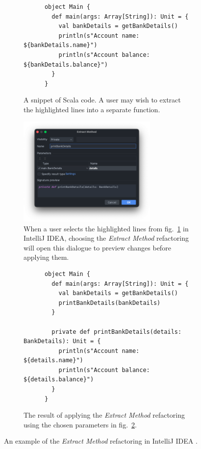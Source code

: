 \begin{figure}[htbp]
  \centering
  \begin{subfigure}{\textwidth}
    \centering
    \begin{verbatim}
      object Main {
        def main(args: Array[String]): Unit = {
          val bankDetails = getBankDetails()
          println(s"Account name: ${bankDetails.name}")
          println(s"Account balance: ${bankDetails.balance}")
        }
      }
    \end{verbatim}
    \caption{A snippet of Scala code. A user may wish to extract the highlighted lines into a separate function.}
    \label{fig:extract-function-intellij-before}
  \end{subfigure}
  \begin{subfigure}{\textwidth}
    \centering
    \includegraphics[width=0.75\textwidth]{background/extract-function-intellij.png}
    \caption{When a user selects the highlighted lines from fig.~\ref{fig:extract-function-intellij-before} in IntelliJ IDEA, choosing the \textit{Extract Method} refactoring will open this dialogue to preview changes before applying them.}
    \label{fig:extract-function-intellij-dialogue}
  \end{subfigure}
  \begin{subfigure}{\textwidth}
    \vspace{3ex} %
    \centering
    \begin{verbatim}
      object Main {
        def main(args: Array[String]): Unit = {
          val bankDetails = getBankDetails()
          printBankDetails(bankDetails)
        }

        private def printBankDetails(details: BankDetails): Unit = {
          println(s"Account name: ${details.name}")
          println(s"Account balance: ${details.balance}")
        }
      }
    \end{verbatim}
    \caption{The result of applying the \textit{Extract Method} refactoring using the chosen parameters in fig.~\ref{fig:extract-function-intellij-dialogue}.}
  \end{subfigure}
  \caption{An example of the \textit{Extract Method} refactoring in IntelliJ IDEA \cite{jetbrains_intellij_2021}.}
  \label{fig:extract-function-intellij}
\end{figure}

